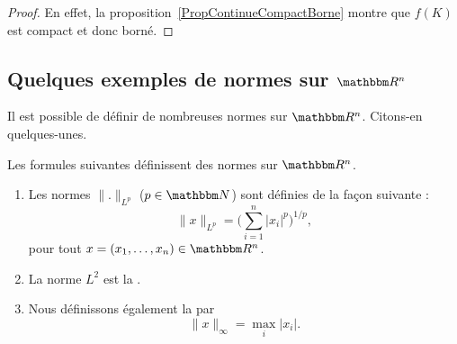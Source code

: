 \begin{proof}
	En effet, la proposition~\ref{PropContinueCompactBorne} montre que $f(K)$ est compact et donc borné.
\end{proof}




\subsection{Quelques exemples de normes sur \texorpdfstring{$\eR^n$}{Rn}}

Il est possible de définir de nombreuses normes sur $\eR^n$. Citons-en quelques-unes.

\begin{propositionDef}      \label{PROPooCLZRooIRxCnZ}
    Les formules suivantes définissent des normes sur \( \eR^n\).
    \begin{enumerate}
        \item
    Les normes $\| . \|_{L^p}$ ($p\in\eN$) sont définies de la façon suivante :
    \begin{equation}		\label{EqDeformeLp}
        \| x \|_{L^p}=\Big( \sum_{i=1}^n| x_i |^p\Big)^{1/p},
    \end{equation}
    pour tout $x=(x_1,\ldots,x_n)\in\eR^n$.
\item
    La norme $L^2$ est la .
\item
    Nous définissons également la  par
    \begin{equation}
	    \| x \|_{\infty}=\max_i| x_i |.
    \end{equation}
    \end{enumerate}
\end{propositionDef}


